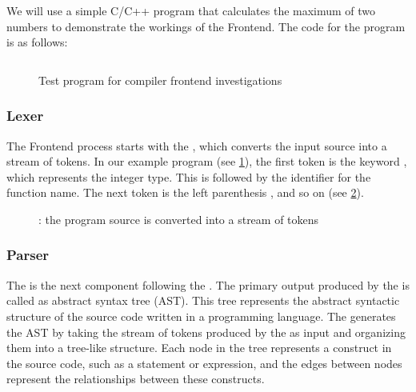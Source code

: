 We will use a simple C/C++ program that calculates the maximum of two numbers to
demonstrate the workings of the Frontend. The code for the program is as
follows: 
\begin{figure}[H]
\inputminted{c++}{./src/part1/ch2_arch/max.cpp}
\caption{Test program for compiler frontend investigations}
\label{fig:arch_max}
\end{figure}
\subsubsection{Lexer}

The Frontend process starts with the \lexer, which converts the input source
into a stream of tokens. In our example program (see \cref{fig:arch_max}), the
first token is the keyword , which represents the integer
type. This is followed by the identifier  for the function
name. The next token is the left parenthesis \myshell{(}, and so on (see
\cref{fig:lexer}). 
\begin{figure}
  \begin{center}
  \end{center}
  \caption{\lexer: the program source is converted into a stream of tokens} 
  \label{fig:lexer}
\end{figure}

\subsubsection{Parser}
The \parser is the next component following the \lexer. The primary output
produced by the \parser is called as abstract syntax tree (AST). This tree
represents the abstract syntactic structure of the source code written in a
programming language. The \parser generates the AST by taking the stream of
tokens produced by the \lexer as input and organizing them into a tree-like
structure. Each node in the tree represents a construct in the source code, such
as a statement or expression, and the edges between nodes represent the
relationships between these constructs. 

